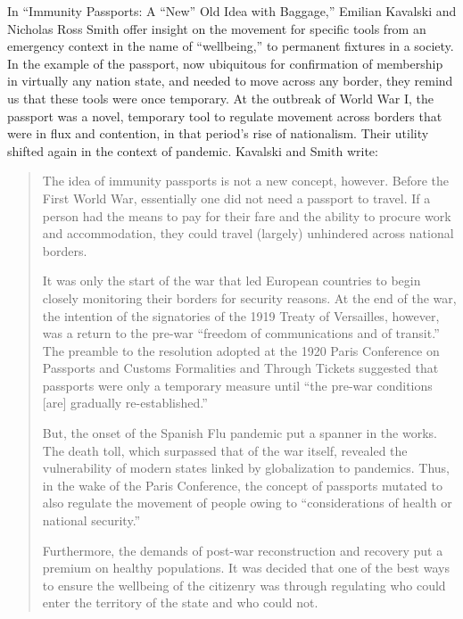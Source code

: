 \documentclass[11pt,dvipdfm]{article}
\begin{document}
In ``Immunity Passports:  A ``New'' Old Idea with Baggage,'' Emilian Kavalski and Nicholas Ross Smith offer insight on the movement for specific tools from an emergency context in the name of ``wellbeing,'' to permanent fixtures in a society.  In the example of the passport, now ubiquitous for confirmation of membership in virtually any nation state, and needed to move across any border, they remind us that these tools were once temporary.  At the outbreak of World War I, the passport was a novel, temporary tool to regulate movement across borders that were in flux and contention, in that period’s rise of nationalism. Their utility shifted again in the context of pandemic.   Kavalski and Smith write:
\begin{quote}
	The idea of immunity passports is not a new concept, however.  Before the First World War, essentially one did not need a passport to travel.  If a person had the means to pay for their fare and the ability to procure work and accommodation, they could travel (largely) unhindered across national borders.
	
	It was only the start of the war that led European countries to begin closely monitoring their borders for security reasons.  At the end of the war, the intention of the signatories of the 1919 Treaty of Versailles, however, was a return to the pre-war ``freedom of communications and of transit.''  The preamble to the resolution adopted at the 1920 Paris Conference on Passports and Customs Formalities and Through Tickets suggested that passports were only a temporary measure until ``the pre-war conditions [are] gradually re-established.''
	
	But, the onset of the Spanish Flu pandemic put a spanner in the works.  The death toll, which surpassed that of the war itself, revealed the vulnerability of modern states linked by globalization to pandemics.  Thus, in the wake of the Paris Conference, the concept of passports mutated to also regulate the movement of people owing to ``considerations of health or national security.''
	
	Furthermore, the demands of post-war reconstruction and recovery put a premium on healthy populations.  It was decided that one of the best ways to ensure the wellbeing of the citizenry was through regulating who could enter the territory of the state and who could not. 	
\end{quote}
\end{document}

